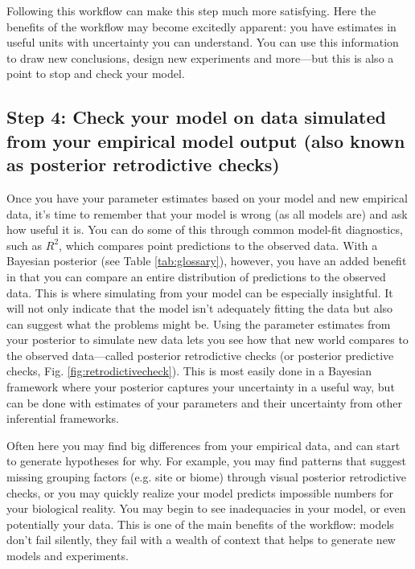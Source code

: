 \documentclass[11pt]{article}
\begin{document}
Following this workflow can make this step much more satisfying. Here the benefits of the workflow may become excitedly apparent: you have estimates in useful units with uncertainty you can understand. You can use this information to draw new conclusions, design new experiments and more---but this is also a point to stop and check your model. 

\subsection*{Step 4: Check your model on data simulated from your empirical model output (also known as posterior retrodictive checks)} 

Once you have your parameter estimates based on your model and new empirical data, it's time to remember that your model is wrong (as all models are) and ask how useful it is. You can do some of this through common model-fit diagnostics, such as $R^2$, which compares point predictions to the observed data. With a Bayesian posterior (see Table \ref{tab:glossary}), however, you have an added benefit in that you can compare an entire distribution of predictions to the observed data. 
This is where simulating from your model can be especially insightful. It will not only indicate that the model isn't adequately fitting the data but also can suggest what the problems might be. Using the parameter estimates from your posterior to simulate new data \citep[][]{held2010,gelman200ppc,conn2018} lets you see how that new world compares to the observed data---called posterior retrodictive checks (or posterior predictive checks, Fig. \ref{fig:retrodictivecheck}). This is most easily done in a Bayesian framework where your posterior captures your uncertainty in a useful way, but can be done with estimates of your parameters and their uncertainty from other inferential frameworks. 

Often here you may find big differences from your empirical data, and can start to generate hypotheses for why. For example, you may find patterns that suggest missing grouping factors (e.g. site or biome) through visual posterior retrodictive checks, or you may quickly realize your model predicts impossible numbers for your biological reality. You may begin to see inadequacies in your model, or even potentially your data.  This is one of the main benefits of the workflow: models don't fail silently, they fail with a wealth of context that helps to generate new models and experiments.
\end{document}
